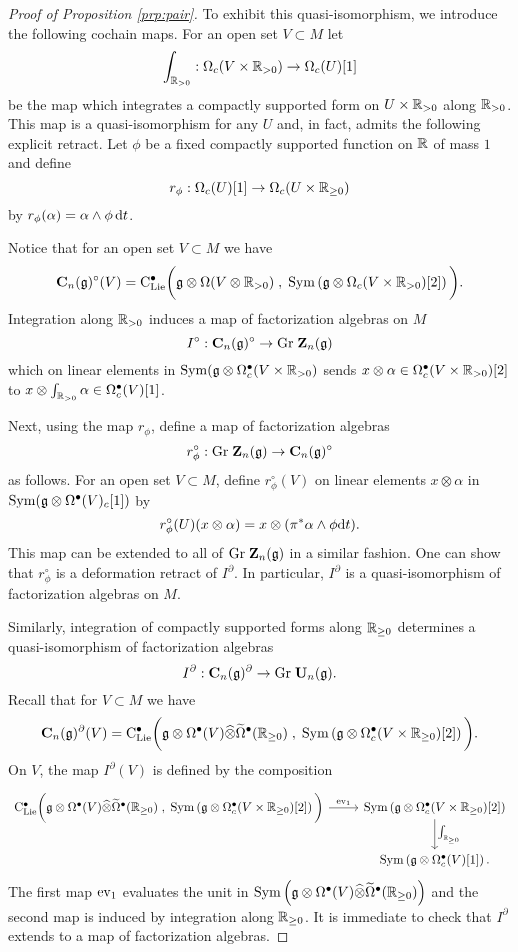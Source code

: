 \documentclass[11pt]{amsart}
\numberwithin{equation}{section}
\begin{document}
\begin{proof}[Proof of Proposition \ref{prp:pair}]
To exhibit this quasi-isomorphism, we introduce the following cochain maps.
For an open set $V \subset M$ let
\[
\int_{\mathbb R_{>0}} : \Omega_c(V \times \mathbb R_{>0}) \to \Omega_c (U) [1] 
\] 
be the map which integrates a compactly supported form on $U \times \mathbb R_{> 0}$ along $\mathbb R_{> 0}$. 
This map is a quasi-isomorphism for any $U$ and, in fact, admits the following explicit retract. 
Let $\phi$ be a fixed compactly supported function on $\mathbb R$ of mass $1$ and define
\[
r_\phi : \Omega_c(U) [1] \to \Omega_c (U \times \mathbb R_{\geq 0})
\]
by $r_\phi (\alpha) = \alpha \wedge \phi \, {\rm d} t$. 

Notice that for an open set $V \subset M$ we have 
\[
\mathbf C_n(\mathfrak g)^{\circ} (V) = {\rm C}_{\rm Lie}^\bullet \bigg(\mathfrak g \otimes \Omega (V \otimes \mathbb R_{>0} ) \; , \; {\rm Sym} \left(\mathfrak g \otimes \Omega_c(V \times \mathbb R_{>0}) [2] \right) \bigg)  .
\]
Integration along $\mathbb R_{>0}$ induces a map of factorization algebras on $M$
\[
I^{\circ} : \mathbf C_n(\mathfrak g)^\circ \to {\rm Gr} \; \mathbf Z_n (\mathfrak g)
\]
which on linear elements in ${\rm Sym}(\mathfrak g \otimes \Omega^\bullet_c (V \times \mathbb R_{>0})$ sends $x \otimes \alpha \in \Omega^\bullet_c(V \times \mathbb R_{>0})[2]$ to $x \otimes \int_{\mathbb R_{>0}} \alpha \in \Omega^\bullet_c (V)[1]$. 

Next, using the map $r_\phi$, define a map of factorization algebras
\[
r_\phi^\circ : {\rm Gr} \; \mathbf Z_n (\mathfrak g) \to \mathbf C_n(\mathfrak g)^\circ
\]
as follows. 
For an open set $V \subset M$, define $r_{\phi}^\circ (V)$ on linear elements $x \otimes \alpha$ in ${\rm Sym}(\mathfrak g \otimes \Omega^\bullet(V)_c[1])$ by
\[
r_\phi^\circ (U) (x \otimes \alpha) = x \otimes (\pi^* \alpha \wedge \phi {\rm d} t)  .
\]
This map can be extended to all of ${\rm Gr} \; \mathbf Z_n(\mathfrak g)$ in a similar fashion. 
One can show that $r_\phi^\circ$ is a deformation retract of $I^\partial$.
In particular, $I^\partial$ is a quasi-isomorphism of factorization algebras on $M$.

Similarly, integration of compactly supported forms along $\mathbb R_{\geq 0}$ determines a quasi-isomorphism of factorization algebras 
\[
I^\partial : \mathbf C_n(\mathfrak g)^\partial \to {\rm Gr} \; \mathbf U_n(\mathfrak g) .
\]
Recall that for $V \subset M$ we have
\[
\mathbf C_n(\mathfrak g)^\partial (V) = {\rm C}_{\rm Lie}^\bullet\bigg(\mathfrak g \otimes \Omega^\bullet(V) \widehat{\otimes} \widetilde{\Omega}^\bullet(\mathbb R_{\geq 0})  \; , \; {\rm Sym}\left(\mathfrak g \otimes \Omega^\bullet_c (V \times \mathbb R_{\geq 0})[2] \right) \bigg) .
\]
On $V$, the map $I^\partial (V)$ is defined by the composition
\[
\begin{tikzcd}
\clies\bigg(\fg \otimes \Omega^\bu(V) \Hat{\otimes} \Tilde{\Omega}^\bu(\RR_{\geq 0})  \; , \; \Sym\left(\fg \otimes \Omega^\bu_c (V \times \RR_{\geq 0})[2] \right) \bigg) \ar[r, "{{\rm ev}_1}"] & \Sym\left(\fg \otimes \Omega^\bu_c (V \times \RR_{\geq 0})[2] \right) \ar[d, "{\int_{\RR_{\geq 0}}}"] \\ &  \Sym\left(\fg \otimes \Omega^\bu_c (V)[1] \right) .
\end{tikzcd}
\]
The first map ${\rm ev}_1$ evaluates the unit in ${\rm Sym} \left(\mathfrak g \otimes \Omega^\bullet(V) \widehat{\otimes} \widetilde{\Omega}^\bullet(\mathbb R_{\geq 0})\right)$ and the second map is induced by integration along $\mathbb R_{\geq 0}$. 
It is immediate to check that $I^{\partial}$ extends to a map of factorization algebras. 


\end{proof}
\end{document}
